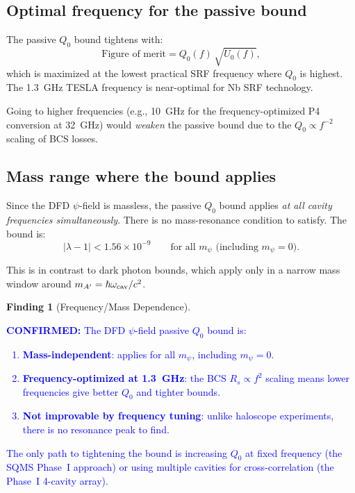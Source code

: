 \documentclass[11pt]{article}
\newcommand{\lbone}{|\lambda - 1|}
\newcommand{\ee}[1]{\times 10^{#1}}
\newcommand{\confirmed}[1]{\textcolor{blue}{\textbf{CONFIRMED:} #1}}
\theoremstyle{definition}
\newtheorem{finding}[theorem]{Finding}
\theoremstyle{remark}
\begin{document}
\subsection{Optimal frequency for the passive bound}

The passive $Q_0$ bound tightens with:
\begin{equation}
\text{Figure of merit} = Q_0(f)\,\sqrt{U_0(f)},
\label{eq:FoM}
\end{equation}
which is maximized at the lowest practical SRF frequency where
$Q_0$ is highest. The 1.3~GHz TESLA frequency is near-optimal
for Nb SRF technology.

Going to higher frequencies (e.g., 10~GHz for the frequency-optimized
P4 conversion at 32~GHz) would \emph{weaken} the passive bound due
to the $Q_0 \propto f^{-2}$ scaling of BCS losses.

\subsection{Mass range where the bound applies}

Since the DFD $\psi$-field is massless, the passive $Q_0$ bound
applies \emph{at all cavity frequencies simultaneously}. There is
no mass-resonance condition to satisfy. The bound is:
\begin{equation}
\lbone < 1.56\ee{-9} \qquad\text{for all $m_\psi$ (including $m_\psi = 0$)}.
\label{eq:universal_bound}
\end{equation}

This is in contrast to dark photon bounds, which apply only in a
narrow mass window around $m_{A'} = \hbar\omega_{\rm cav}/c^2$.

\begin{finding}[Frequency/Mass Dependence]
\label{find:frequency}
\confirmed{The DFD $\psi$-field passive $Q_0$ bound is:
\begin{enumerate}[nosep]
\item \textbf{Mass-independent}: applies for all $m_\psi$, including
  $m_\psi = 0$.
\item \textbf{Frequency-optimized at 1.3~GHz}: the BCS $R_s \propto f^2$
  scaling means lower frequencies give better $Q_0$ and tighter bounds.
\item \textbf{Not improvable by frequency tuning}: unlike haloscope
  experiments, there is no resonance peak to find.
\end{enumerate}

The only path to tightening the bound is increasing $Q_0$ at fixed
frequency (the SQMS Phase~I approach) or using multiple cavities for
cross-correlation (the Phase~I 4-cavity array).}
\end{finding}
\end{document}
